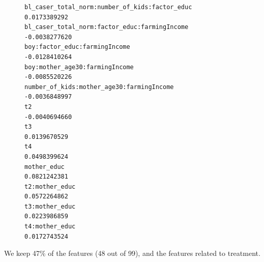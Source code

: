 \documentclass{article}
\begin{document}
\begin{figure}[H]
\begin{lstlisting}[style=RstyleCommentSmall, caption=CATE with Controls selected by LASSO - Only Showing Non-Zero Variables]
bl_caser_total_norm:number_of_kids:factor_educ    0.0173389292
bl_caser_total_norm:factor_educ:farmingIncome    -0.0038277620
boy:factor_educ:farmingIncome                    -0.0128410264
boy:mother_age30:farmingIncome                   -0.0085520226
number_of_kids:mother_age30:farmingIncome        -0.0036848997
t2                                               -0.0040694660
t3                                                0.0139670529
t4                                                0.0498399624
mother_educ                                       0.0821242381
t2:mother_educ                                    0.0572264862
t3:mother_educ                                    0.0223986859
t4:mother_educ                                    0.0172743524
\end{lstlisting}
\end{figure}

We keep 47\% of the features (48 out of 99), and the features related to treatment.
\end{document}
